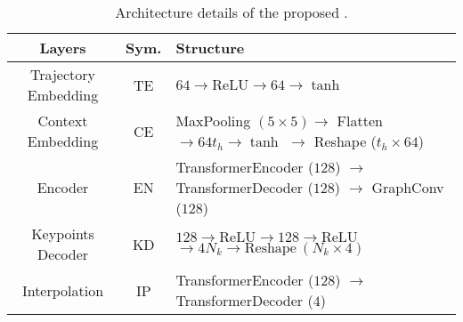 \documentclass[../paper.tex]{subfiles}
\begin{document}
\begin{table}[tbp]
    \renewcommand{\arraystretch}{1.3}
    \caption{
        Architecture details of the proposed \MODEL.
    }
    \label{tab_method}
    \centering
    \begin{tabular}{c|c|l}
        \hline
        Layers & Sym. & Structure \\
        
        \hline
        Trajectory Embedding & TE & $64 \to \mbox{ReLU} \to 64 \to \tanh$ \\

        \hline
        Context Embedding & CE & \makecell[l]{
            MaxPooling $(5 \times 5) \to$ Flatten \\
            $\to 64t_h \to \tanh$ \\
            $\to$ Reshape ($t_h \times 64$)
        }\\

        \hline
        Encoder & EN & \makecell[l]{
            TransformerEncoder ($128$) $\to$ \\
            TransformerDecoder ($128$) $\to$ \\
            GraphConv ($128$)
        }\\

        \hline
        Keypoints Decoder & KD & \makecell[l]{
            $128 \to \mbox{ReLU} \to 128 \to \mbox{ReLU}$ \\
            $\to 4N_k \to \mbox{Reshape}~(N_k \times 4)$
        }\\

        \hline
        Interpolation & IP & \makecell[l]{
            TransformerEncoder ($128$) $\to$ \\
            TransformerDecoder ($4$)
        }\\
        
        
        \hline
    \end{tabular}
\end{table}
\end{document}
